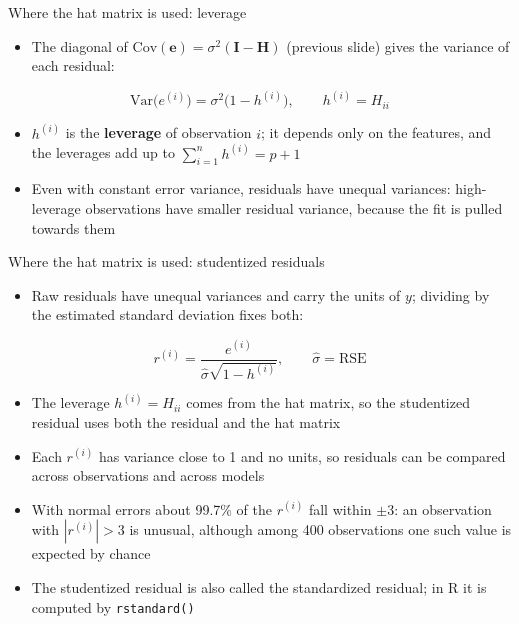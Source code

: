 \begin{frame}{Where the hat matrix is used: leverage}
    \begin{itemize}
        \item The diagonal of $\mathrm{Cov}(\mathbf{e}) = \sigma^2 (\mathbf{I} - \mathbf{H})$ (previous slide) gives the variance of each residual:
    \end{itemize}
    \[
        \mathrm{Var}\big(e^{(i)}\big) = \sigma^2 \big(1 - h^{(i)}\big), \qquad h^{(i)} = H_{ii}
    \]
    \begin{itemize}
        \item $h^{(i)}$ is the \textbf{leverage} of observation $i$; it depends only on the features, and the leverages add up to $\sum_{i=1}^{n} h^{(i)} = p+1$
        \item Even with constant error variance, residuals have unequal variances: high-leverage observations have smaller residual variance, because the fit is pulled towards them
    \end{itemize}
\end{frame}


\begin{frame}{Where the hat matrix is used: studentized residuals}
    \begin{itemize}
        \item Raw residuals have unequal variances and carry the units of $y$; dividing by the estimated standard deviation fixes both:
    \end{itemize}
    \[
        r^{(i)} = \frac{e^{(i)}}{\hat\sigma \sqrt{1 - h^{(i)}}}, \qquad \hat\sigma = \mathrm{RSE}
    \]
    \begin{itemize}
        \item The leverage $h^{(i)} = H_{ii}$ comes from the hat matrix, so the studentized residual uses both the residual and the hat matrix
        \item Each $r^{(i)}$ has variance close to 1 and no units, so residuals can be compared across observations and across models
        \item With normal errors about 99.7\% of the $r^{(i)}$ fall within $\pm 3$: an observation with $|r^{(i)}| > 3$ is unusual, although among 400 observations one such value is expected by chance
        \item The studentized residual is also called the standardized residual; in R it is computed by \texttt{rstandard()}
    \end{itemize}
\end{frame}


